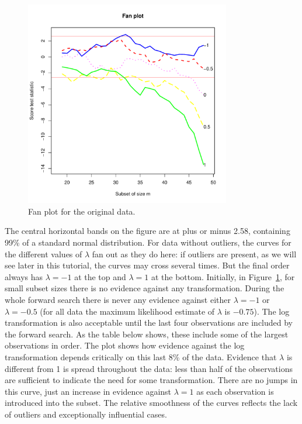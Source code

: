 \documentclass[article,shortnames,nojss]{jss}
\begin{document}
\begin{center}
\begin{figure}[H]
\includegraphics[width=0.8\textwidth]{transreg-ex-1}
\caption{Fan plot for the original  data.}
\label{fig:ex-1}
\end{figure}
\end{center}

The central horizontal bands on the figure are at plus or minus 2.58, containing 99\% of a standard normal distribution. For data without outliers, the curves for the different values of $\lambda$ fan out as they do here: if outliers are present, as we will see later in this tutorial, the curves may cross several times. But the final order always has $\lambda=-1$ at the top and $\lambda=1$ at the bottom. Initially, in Figure~\ref{fig:ex-1}, for small subset sizes there is no evidence against any transformation. During the whole forward search there is never any evidence against either $\lambda=-1$ or $\lambda=-0.5$ (for all data the maximum likelihood estimate of $\lambda$ is $-0.75$). The log transformation is also acceptable until the last four observations are included by the forward search. As the table below shows, these include some of the largest observations in order. The plot shows how evidence against the log transformation depends critically on this last 8\% of the data. Evidence that $\lambda$ is different from 1 is spread throughout the data: less than half of the observations are sufficient to indicate the need for some transformation. There are no jumps in this curve, just an increase in evidence against $\lambda=1$ as each observation is introduced into the subset. The relative smoothness of the curves reflects the lack of outliers and exceptionally influential cases.
\end{document}
